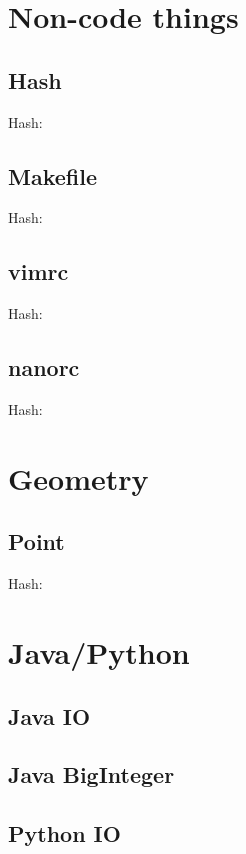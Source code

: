 \documentclass[10pt]{article}
\newcommand{\inputfile}[2]{
    Hash: \texttt{}
    
}
\begin{document}
\begin{multicols*}{3}
    \tableofcontents


    \section{Non-code things}
    \subsection{Hash}
    \inputfile{hash.sh}{txt}
    \subsection{Makefile}
    \inputfile{Makefile}{txt}
    \subsection{vimrc}
    \inputfile{vimrc}{txt}
    \subsection{nanorc}
    \inputfile{nanorc}{txt}

    \section{Geometry}
    \subsection{Point}
    \inputfile{kactl-geometry-point.h}{cpp}

    \section{Java/Python}
    \subsection{Java IO}
    \subsection{Java BigInteger}
    \subsection{Python IO}

\end{multicols*}
\end{document}
